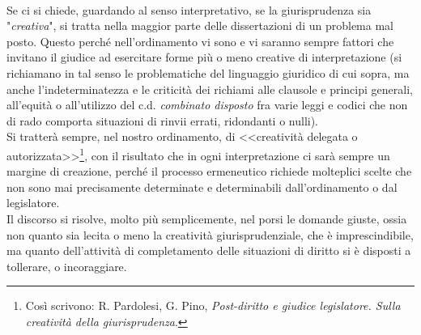 \\Se ci si chiede, guardando al senso interpretativo, se la giurisprudenza sia "\textit{creativa}", si tratta nella maggior parte delle dissertazioni di un problema mal posto.
Questo perché nell'ordinamento vi sono e vi saranno sempre fattori che invitano il giudice ad esercitare forme più o meno creative di interpretazione (si richiamano in tal senso le problematiche del linguaggio giuridico di cui sopra, ma anche l'indeterminatezza e le criticità dei richiami alle clausole e principi generali, all'equità o all'utilizzo del c.d. \textit{combinato disposto} fra varie leggi e codici che non di rado comporta situazioni di rinvii errati, ridondanti o nulli).
\\Si tratterà sempre, nel nostro ordinamento, di <<creatività delegata o autorizzata>>\footnote{Così scrivono: R. Pardolesi, G. Pino, \textit{Post-diritto e giudice legislatore. Sulla creatività della giurisprudenza}.}, con il risultato che in ogni interpretazione ci sarà sempre un margine di creazione, perché il processo ermeneutico richiede molteplici scelte che non sono mai precisamente determinate e determinabili dall'ordinamento o dal legislatore.
\\Il discorso si risolve, molto più semplicemente, nel porsi le domande giuste, ossia non quanto sia lecita o meno la creatività giurisprudenziale, che è imprescindibile, ma quanto dell'attività di completamento delle situazioni di diritto si è disposti a tollerare, o incoraggiare.
